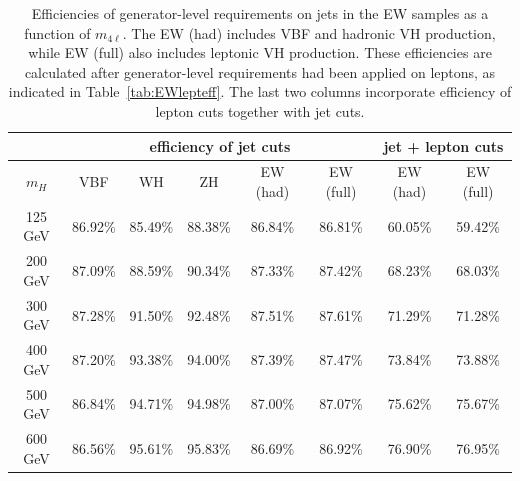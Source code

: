 \begin{table}[!hbt]
\begin{center}
\small
\begin{tabular}{|c|c|c|c|c|c|c|c|}
\hline
\multicolumn{1}{|c}{~} & \multicolumn{5}{|c|}{efficiency of jet cuts} & \multicolumn{2}{c|}{jet + lepton cuts} \\
\hline
$m_H$ & VBF & WH  & ZH  & EW (had) & EW (full)   & EW (had) & EW (full)          \\ 
\hline
125 GeV  & 86.92\%    & 85.49\%    & 88.38\%    & 86.84\%     & 86.81\%     & 60.05\%     & 59.42\%              \\ 
200 GeV  & 87.09\%    & 88.59\%    & 90.34\%    & 87.33\%     & 87.42\%     & 68.23\%     & 68.03\%             \\ 
300 GeV  & 87.28\%    & 91.50\%    & 92.48\%    & 87.51\%     & 87.61\%     & 71.29\%     & 71.28\%             \\ 
400 GeV  & 87.20\%    & 93.38\%    & 94.00\%    & 87.39\%     & 87.47\%     & 73.84\%     & 73.88\%             \\  
500 GeV  & 86.84\%    & 94.71\%    & 94.98\%    & 87.00\%     & 87.07\%     & 75.62\%     & 75.67\%              \\  
600 GeV  & 86.56\%    & 95.61\%    & 95.83\%    & 86.69\%     & 86.92\%     & 76.90\%     & 76.95\%              \\  
\hline
\end{tabular}
\caption{
Efficiencies of generator-level requirements on jets in the \offshell EW samples as a function of $m_{4\ell}$.
The EW (had) includes VBF and hadronic VH production, while EW (full) also includes leptonic VH production. 
These efficiencies are calculated after generator-level requirements had been applied on leptons,
as indicated in Table~\ref{tab:EWlepteff}.
The last two columns incorporate efficiency of lepton cuts together with jet cuts. 
}
\label{tab:EWjeteff}
\end{center}
\end{table}



